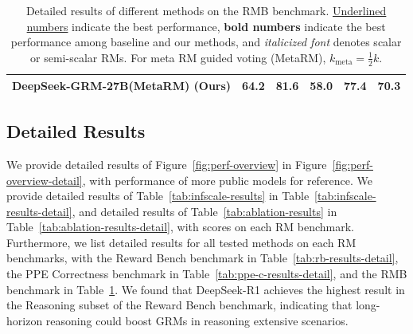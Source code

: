\documentclass{article} %
\newcommand{\SGRM}{DeepSeek-GRM-27B\xspace}
\begin{document}
\begin{table}[t]
{\begin{tabular}{lccccc}
  \textbf{\SGRM (MetaRM) (Ours)} &  64.2  &  81.6  &   58.0  &   77.4  &  70.3 \\
  \bottomrule
  \end{tabular}
  }
  \caption{Detailed results of different methods on the RMB benchmark. \uline{Underlined numbers} indicate the best performance, \textbf{bold numbers} indicate the best performance among baseline and our methods, and \textit{italicized font} denotes scalar or semi-scalar RMs. For meta RM guided voting (MetaRM), $k_{\mathrm{meta}} = \frac{1}{2}k$.}
  \label{tab:rmb-results-detail}
  \vspace{-1em}
\end{table}


\subsection{Detailed Results}\label{app:result-detail}

We provide detailed results of Figure~\ref{fig:perf-overview} in Figure~\ref{fig:perf-overview-detail}, with performance of more public models for reference. 
We provide detailed results of Table~\ref{tab:infscale-results} in Table~\ref{tab:infscale-results-detail}, and detailed results of Table~\ref{tab:ablation-results} in Table~\ref{tab:ablation-results-detail}, with scores on each RM benchmark. Furthermore, we list detailed results for all tested methods on each RM benchmarks, with the Reward Bench benchmark in Table~\ref{tab:rb-results-detail}, the PPE Correctness benchmark in Table~\ref{tab:ppe-c-results-detail}, and the RMB benchmark in Table~\ref{tab:rmb-results-detail}. We found that DeepSeek-R1 achieves the highest result in the Reasoning subset of the Reward Bench benchmark, indicating that long-horizon reasoning could boost GRMs in reasoning extensive scenarios. 
\end{document}
